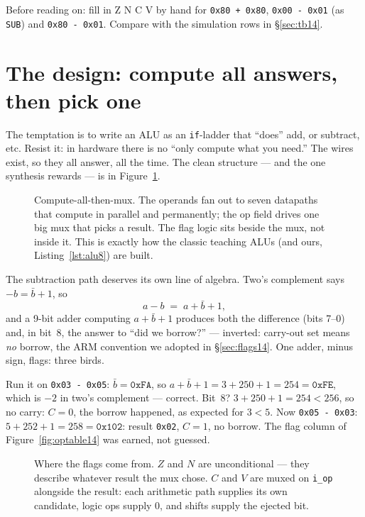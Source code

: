 \begin{checkpoint}
Before reading on: fill in Z N C V by hand for \texttt{0x80 + 0x80},
\texttt{0x00 - 0x01} (as \texttt{SUB}) and \texttt{0x80 - 0x01}.
Compare with the simulation rows in \S\ref{sec:tb14}.
\end{checkpoint}

\section{The design: compute all answers, then pick one}
\label{sec:design14}

The temptation is to write an ALU as an \texttt{if}-ladder that
``does'' add, or subtract, etc. Resist it: in hardware there is no
``only compute what you need.'' The wires exist, so they all answer,
all the time. The clean structure --- and the one synthesis rewards
--- is in Figure~\ref{fig:structure14}.

\begin{figure}[htbp]
\centering

\caption{Compute-all-then-mux. The operands fan out to seven datapaths
that compute in parallel and permanently; the op field drives one big
mux that picks a result. The flag logic sits beside the mux, not
inside it. This is exactly how the classic teaching ALUs (and ours,
Listing~\ref{lst:alu8}) are built.}
\label{fig:structure14}
\end{figure}

The subtraction path deserves its own line of algebra. Two's
complement says $-b=\bar b+1$, so
\[
a-b \;=\; a+\bar b+1,
\]
and a 9-bit adder computing $a+\bar b+1$ produces both the difference
(bits 7--0) and, in bit~8, the answer to ``did we borrow?'' ---
inverted: carry-out set means \emph{no} borrow, the ARM convention we
adopted in \S\ref{sec:flags14}. One adder, minus sign, flags: three
birds.

\begin{example}
Run it on \texttt{0x03 - 0x05}: $\bar b=\texttt{0xFA}$, so
$a+\bar b+1 = 3+250+1 = 254 = \texttt{0xFE}$, which is $-2$ in two's
complement --- correct. Bit~8? $3+250+1=254<256$, so no carry:
$C=0$, the borrow happened, as expected for $3<5$. Now
\texttt{0x05 - 0x03}: $5+252+1=258=\texttt{0x102}$: result
\texttt{0x02}, $C=1$, no borrow. The flag column of
Figure~\ref{fig:optable14} was earned, not guessed.
\end{example}

\begin{figure}[htbp]
\centering

\caption{Where the flags come from. $Z$ and $N$ are unconditional ---
they describe whatever result the mux chose. $C$ and $V$ are muxed on
\texttt{i\_op} alongside the result: each arithmetic path supplies its
own candidate, logic ops supply 0, and shifts supply the ejected bit.}
\label{fig:flags14}
\end{figure}

